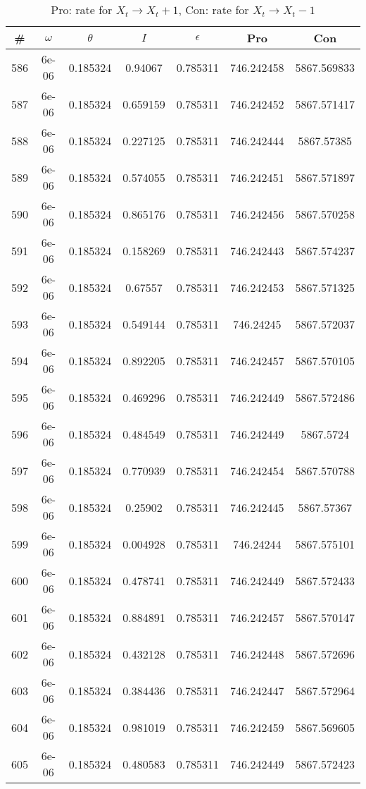 \newpage
\begin{table}
\caption{Pro: rate for $X_t \rightarrow X_t + 1$, Con: rate for $X_t \rightarrow X_t - 1$}
\begin{tabular*}{\linewidth}{c|c|c|c|c|c|c}
\# & $\omega$ & $\theta$ & $I$ & $\epsilon$ & Pro & Con \\
\hline
586 & 6e-06 & 0.185324 & 0.94067 & 0.785311 & 746.242458 & 5867.569833\\
587 & 6e-06 & 0.185324 & 0.659159 & 0.785311 & 746.242452 & 5867.571417\\
588 & 6e-06 & 0.185324 & 0.227125 & 0.785311 & 746.242444 & 5867.57385\\
589 & 6e-06 & 0.185324 & 0.574055 & 0.785311 & 746.242451 & 5867.571897\\
590 & 6e-06 & 0.185324 & 0.865176 & 0.785311 & 746.242456 & 5867.570258\\
591 & 6e-06 & 0.185324 & 0.158269 & 0.785311 & 746.242443 & 5867.574237\\
592 & 6e-06 & 0.185324 & 0.67557 & 0.785311 & 746.242453 & 5867.571325\\
593 & 6e-06 & 0.185324 & 0.549144 & 0.785311 & 746.24245 & 5867.572037\\
594 & 6e-06 & 0.185324 & 0.892205 & 0.785311 & 746.242457 & 5867.570105\\
595 & 6e-06 & 0.185324 & 0.469296 & 0.785311 & 746.242449 & 5867.572486\\
596 & 6e-06 & 0.185324 & 0.484549 & 0.785311 & 746.242449 & 5867.5724\\
597 & 6e-06 & 0.185324 & 0.770939 & 0.785311 & 746.242454 & 5867.570788\\
598 & 6e-06 & 0.185324 & 0.25902 & 0.785311 & 746.242445 & 5867.57367\\
599 & 6e-06 & 0.185324 & 0.004928 & 0.785311 & 746.24244 & 5867.575101\\
600 & 6e-06 & 0.185324 & 0.478741 & 0.785311 & 746.242449 & 5867.572433\\
601 & 6e-06 & 0.185324 & 0.884891 & 0.785311 & 746.242457 & 5867.570147\\
602 & 6e-06 & 0.185324 & 0.432128 & 0.785311 & 746.242448 & 5867.572696\\
603 & 6e-06 & 0.185324 & 0.384436 & 0.785311 & 746.242447 & 5867.572964\\
604 & 6e-06 & 0.185324 & 0.981019 & 0.785311 & 746.242459 & 5867.569605\\
605 & 6e-06 & 0.185324 & 0.480583 & 0.785311 & 746.242449 & 5867.572423\\

\end{tabular*}
\end{table}
